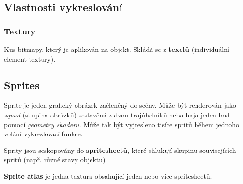 \subsection*{Vlastnosti vykreslování}

\medskip

\subsubsection*{Textury}

Kus bitmapy, který je aplikován na objekt.
Skládá se z \textbf{texelů} (individuální element textury).

\subsection*{Sprites}

Sprite je jeden grafický obrázek začleněný do scény.
Může být renderován jako \textit{squad} (skupina obrázků) sestavěná z dvou trojúhelníků nebo hajo jeden bod pomocí \textit{geometry shaderu}.
Může tak být vyjresleno tisíce spritů během jednoho volání vykreslovací funkce.

Sprity jsou seskopovány do \textbf{spritesheetů}, které shlukují skupinu souvisejících spritů (např. různé stavy objektu).

\textbf{Sprite atlas} je jedna textura obsahující jeden nebo více spritesheetů.
